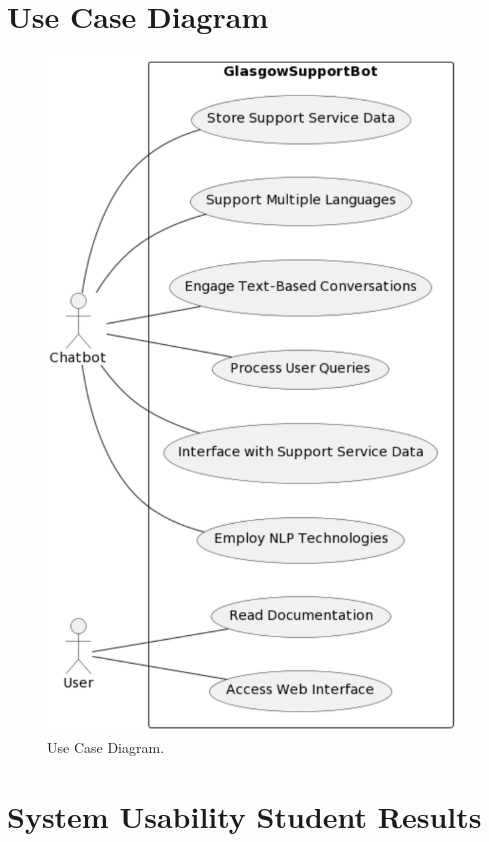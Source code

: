 \documentclass{l4proj}
\begin{document}
\begin{appendices}
\chapter{Use Case Diagram}
\label{Use Case Diagram}

\begin{figure}[h!]
  \centering
  \begin{adjustbox}{center,max height=0.6\textheight, max width=\linewidth}
    \includegraphics{images/usecase.png}
  \end{adjustbox}
  \caption{Use Case Diagram.}
  \label{fig:usecasediagram}
\end{figure}

\chapter{System Usability Student Results}
\label{System Usability Student Results}


\end{appendices}
\end{document}
